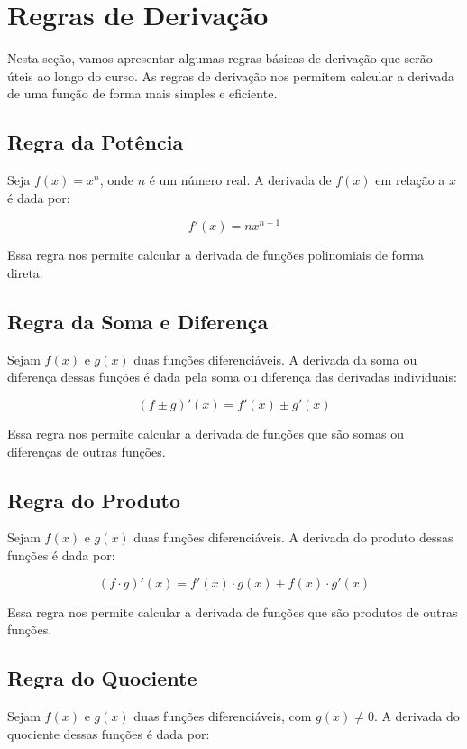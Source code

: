 \documentclass[12pt]{article}
\begin{document}
\pagebreak
\section{Regras de Derivação}

Nesta seção, vamos apresentar algumas regras básicas de derivação que serão úteis ao longo do curso. As regras de derivação nos permitem calcular a derivada de uma função de forma mais simples e eficiente.

\subsection{Regra da Potência}

Seja $f(x) = x^n$, onde $n$ é um número real. A derivada de $f(x)$ em relação a $x$ é dada por:

\[
f'(x) = nx^{n-1}
\]

Essa regra nos permite calcular a derivada de funções polinomiais de forma direta.

\subsection{Regra da Soma e Diferença}

Sejam $f(x)$ e $g(x)$ duas funções diferenciáveis. A derivada da soma ou diferença dessas funções é dada pela soma ou diferença das derivadas individuais:

\[
(f \pm g)'(x) = f'(x) \pm g'(x)
\]

Essa regra nos permite calcular a derivada de funções que são somas ou diferenças de outras funções.

\subsection{Regra do Produto}

Sejam $f(x)$ e $g(x)$ duas funções diferenciáveis. A derivada do produto dessas funções é dada por:

\[
(f \cdot g)'(x) = f'(x) \cdot g(x) + f(x) \cdot g'(x)
\]

Essa regra nos permite calcular a derivada de funções que são produtos de outras funções.

\subsection{Regra do Quociente}

Sejam $f(x)$ e $g(x)$ duas funções diferenciáveis, com $g(x) \neq 0$. A derivada do quociente dessas funções é dada por:
\end{document}
